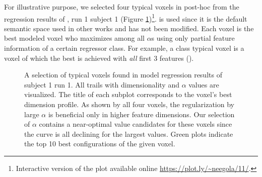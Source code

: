 For illustrative purpose, we selected four typical voxels in post-hoc from the regression results of , run 1 subject 1 (Figure \ref{fig:TypicalVoxelDistributionS1R1})\footnote{Interactive version of the plot available online \url{https://plot.ly/~neegola/11/}.}.  is used since it is the default semantic space used in other works and has not been modified. Each voxel is the best modeled voxel who maximizes  among all \(\alpha\)s using only partial feature information of a certain regressor class. For example, a  class typical voxel is a voxel of which the best  is achieved with \emph{all} first 3 features (). 

\begin{figure}
    \centering
    \caption[Typical-Voxels' Response to \(\alpha\) and Dimension]{A selection of typical voxels found in  model regression results of subject 1 run 1. All trails with dimensionality and \(\alpha\) values are visualized. The title of each subplot corresponds to the voxel's best dimension profile. As shown by all four voxels, the regularization by large \(\alpha\) is beneficial only in higher feature dimensions. Our selection of \(\alpha\) contains a near-optimal value candidates for these voxels since the curve is all declining for the largest values. Green plots indicate the top 10 best configurations of the given voxel.} 
    \label{fig:TypicalVoxelDistributionS1R1}
\end{figure}

